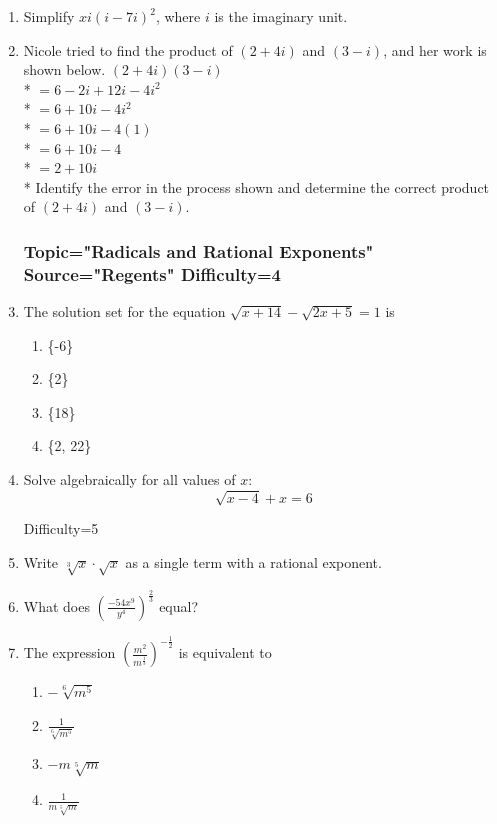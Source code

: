 \documentclass[12pt, oneside]{article}
\begin{document}
\begin{enumerate}
\item Simplify $xi(i - 7i)^2$, where $i$ is the imaginary unit. %

\item Nicole tried to find the product of $(2+ 4i)$ and $(3 - i)$, and her work is shown below.
$(2 + 4i)(3 - i)$\\*
$=6 - 2i + 12i - 4i^2$\\*
$=6 + 10i - 4i^2$\\*
$=6 + 10i - 4(1)$\\*
$=6 + 10i - 4$\\*
$=2 + 10i$\\*
Identify the error in the process shown and determine the correct product of $(2+ 4i)$ and $(3 - i)$.%

\subsubsection*{Topic="Radicals and Rational Exponents"\\
Source="Regents" 
Difficulty=4}

\item The solution set for the equation $\sqrt{x+14}- \sqrt{2x+5}= 1$ is
\begin{enumerate}
    \item \{-6\}
    \item \{2\}
    \item \{18\}
    \item \{2, 22\}
\end{enumerate} %

\item Solve algebraically for all values of $x$: 
\[\sqrt{x-4}+x=6\] %


Difficulty=5
\item Write $\sqrt[3]x \cdot \sqrt{x}$ as a single term with a rational exponent. %

\item What does $\displaystyle \left( \frac{-54x^9}{y^4} \right)^\frac{2}{3}$ equal? %

\item The expression $\displaystyle \left( \frac{m^2}{m^\frac{1}{3}}\right)^{-\frac{1}{2}}$ is equivalent to 
\begin{enumerate}
    \item $-\sqrt[6]{m^5}$
    \item $\displaystyle \frac{1}{\sqrt[6]{m^5}}$
    \item $-m \sqrt[5]{m}$
    \item $\displaystyle \frac{1}{m \sqrt[5]{m}}$
\end{enumerate} %


\end{enumerate}
\end{document}

